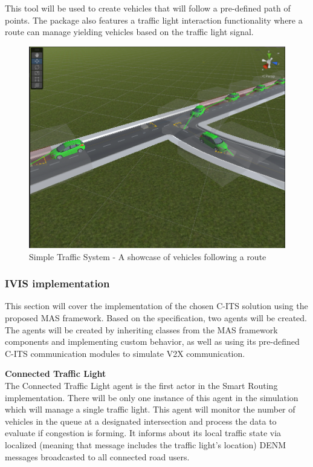 \documentclass[main.tex]{subfiles}
\begin{document}
This tool will be used to create vehicles that will follow a pre-defined path of points. 
The package also features a traffic light interaction functionality where a route can manage
yielding vehicles based on the traffic light signal. 

\begin{figure}[htbp]
    \centering
    \includegraphics[width=.8\textwidth]{simple-traffic-system.png} 
    \caption{Simple Traffic System - A showcase of vehicles following a route}
    \label{fig-sts}
\end{figure}

\subsubsection{IVIS implementation}

This section will cover the implementation of the chosen C-ITS solution using the proposed 
MAS framework. Based on the specification, two agents will be created. The agents will be 
created by inheriting classes from the MAS framework components and implementing custom behavior, as 
well as using its pre-defined C-ITS communication modules to simulate V2X communication. 

\textbf{Connected Traffic Light} \smallskip \\
The Connected Traffic Light agent is the first actor in the Smart Routing implementation.
There will be only one instance of this agent in the simulation which will manage a 
single traffic light. This agent will monitor the number of vehicles in the queue at a
designated intersection and process the data to evaluate if congestion is forming. It informs
about its local traffic state via localized (meaning that message includes the traffic light's
location) DENM messages broadcasted to all connected road users.
\end{document}
